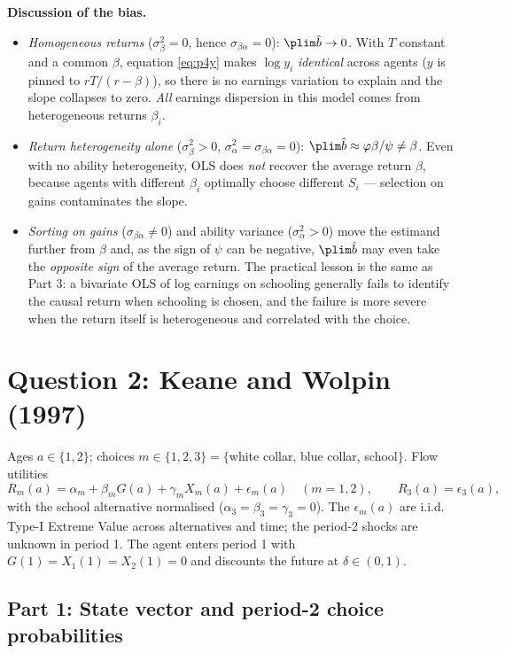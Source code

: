 \documentclass[11pt,english]{article}
\begin{document}
\textbf{Discussion of the bias.}
\begin{itemize}[nosep]
\item \emph{Homogeneous returns} ($\sigma_\beta^2=0$, hence
$\sigma_{\beta\alpha}=0$): $\plim\hat b\to0$. With $T$ constant and a common
$\beta$, equation \eqref{eq:p4y} makes $\log y_i$ \emph{identical} across agents
($y$ is pinned to $rT/(r-\beta)$), so there is no earnings variation to explain
and the slope collapses to zero. \emph{All} earnings dispersion in this model
comes from heterogeneous returns $\beta_i$.
\item \emph{Return heterogeneity alone} ($\sigma_\beta^2>0$,
$\sigma_\alpha^2=\sigma_{\beta\alpha}=0$): $\plim\hat b\approx\varphi\beta/\psi
\neq\beta$. Even with no ability heterogeneity, OLS does \emph{not} recover the
average return $\beta$, because agents with different $\beta_i$ optimally choose
different $S_i$ --- selection on gains contaminates the slope.
\item \emph{Sorting on gains} ($\sigma_{\beta\alpha}\neq0$) and ability variance
($\sigma_\alpha^2>0$) move the estimand further from $\beta$ and, as the sign of
$\psi$ can be negative, $\plim\hat b$ may even take the \emph{opposite sign} of
the average return. The practical lesson is the same as Part 3: a bivariate OLS
of log earnings on schooling generally fails to identify the causal return when
schooling is chosen, and the failure is more severe when the return itself is
heterogeneous and correlated with the choice.
\end{itemize}

\section*{Question 2: Keane and Wolpin (1997)}

Ages $a\in\{1,2\}$; choices $m\in\{1,2,3\}=\{$white collar, blue collar,
school$\}$. Flow utilities
\[
R_{m}(a)=\alpha_{m}+\beta_{m}G(a)+\gamma_{m}X_{m}(a)+\epsilon_{m}(a)\quad(m=1,2),
\qquad R_{3}(a)=\epsilon_{3}(a),
\]
with the school alternative normalised
($\alpha_{3}=\beta_{3}=\gamma_{3}=0$). The $\epsilon_{m}(a)$ are i.i.d. Type-I
Extreme Value across alternatives and time; the period-2 shocks are unknown in
period 1. The agent enters period 1 with $G(1)=X_1(1)=X_2(1)=0$ and discounts
the future at $\delta\in(0,1)$.

\subsection*{Part 1: State vector and period-2 choice probabilities}
\end{document}
